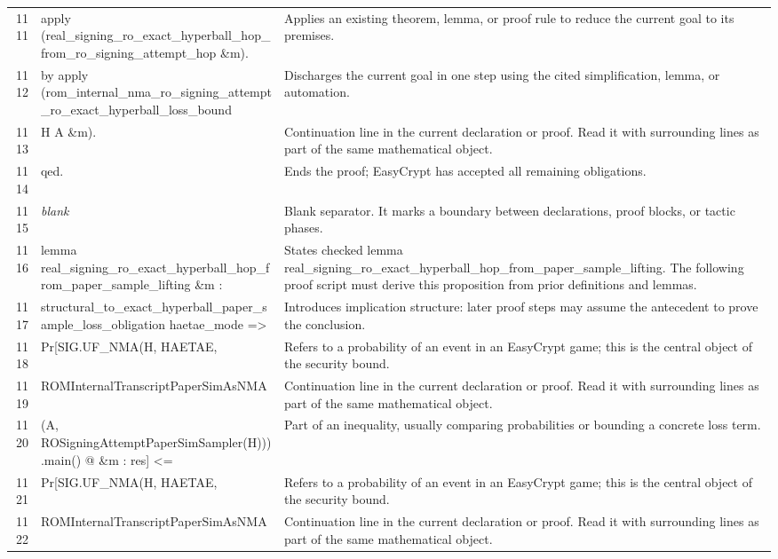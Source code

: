 \documentclass[10pt]{article}
\begin{document}
\begin{longtable}{r L{0.53\textwidth} L{0.37\textwidth}}
1111 & {\ttfamily\scriptsize apply (real\_signing\_ro\_exact\_hyperball\_hop\_from\_ro\_signing\_attempt\_hop \&m).} & Applies an existing theorem, lemma, or proof rule to reduce the current goal to its premises. \\
1112 & {\ttfamily\scriptsize by apply (rom\_internal\_nma\_ro\_signing\_attempt\_ro\_exact\_hyperball\_loss\_bound} & Discharges the current goal in one step using the cited simplification, lemma, or automation. \\
1113 & {\ttfamily\scriptsize             H A \&m).} & Continuation line in the current declaration or proof.  Read it with surrounding lines as part of the same mathematical object. \\
1114 & {\ttfamily\scriptsize qed.} & Ends the proof; EasyCrypt has accepted all remaining obligations. \\
1115 & {\ttfamily\scriptsize \emph{blank}} & Blank separator.  It marks a boundary between declarations, proof blocks, or tactic phases. \\
1116 & {\ttfamily\scriptsize lemma real\_signing\_ro\_exact\_hyperball\_hop\_from\_paper\_sample\_lifting \&m :} & States checked lemma real\_signing\_ro\_exact\_hyperball\_hop\_from\_paper\_sample\_lifting.  The following proof script must derive this proposition from prior definitions and lemmas. \\
1117 & {\ttfamily\scriptsize   structural\_to\_exact\_hyperball\_paper\_sample\_loss\_obligation haetae\_mode =>} & Introduces implication structure: later proof steps may assume the antecedent to prove the conclusion. \\
1118 & {\ttfamily\scriptsize   Pr[SIG.UF\_NMA(H, HAETAE,} & Refers to a probability of an event in an EasyCrypt game; this is the central object of the security bound. \\
1119 & {\ttfamily\scriptsize        ROMInternalTranscriptPaperSimAsNMA} & Continuation line in the current declaration or proof.  Read it with surrounding lines as part of the same mathematical object. \\
1120 & {\ttfamily\scriptsize          (A, ROSigningAttemptPaperSimSampler(H))).main() @ \&m : res] <=} & Part of an inequality, usually comparing probabilities or bounding a concrete loss term. \\
1121 & {\ttfamily\scriptsize   Pr[SIG.UF\_NMA(H, HAETAE,} & Refers to a probability of an event in an EasyCrypt game; this is the central object of the security bound. \\
1122 & {\ttfamily\scriptsize        ROMInternalTranscriptPaperSimAsNMA} & Continuation line in the current declaration or proof.  Read it with surrounding lines as part of the same mathematical object. \\

\end{longtable}
\end{document}
